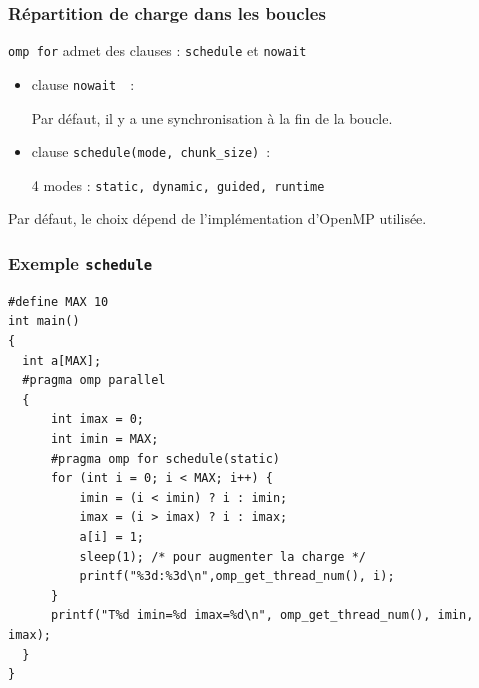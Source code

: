 \documentclass{beamer}
\begin{document}
\begin{frame}
  \frametitle{Répartition de charge dans les boucles}
  
  \texttt{omp for} admet des clauses : {\tt schedule} et {\tt  nowait}
  
\bigskip
\begin{itemize}
\item clause {\tt nowait }~:

  Par défaut, il y a une synchronisation à la fin de la boucle.
  
\bigskip
\item clause {\tt schedule(mode, chunk\_size)}~:
  
  4 modes : {\tt static, dynamic, guided, runtime}
\end{itemize}
\bigskip
  Par défaut, le choix dépend de l'implémentation d'OpenMP utilisée.
\end{frame}

\begin{frame}[fragile]
   \frametitle{Exemple {\tt schedule}}
   \small
  
\begin{verbatim}
#define MAX 10
int main()
{
  int a[MAX];
  #pragma omp parallel
  {
      int imax = 0;
      int imin = MAX;
      #pragma omp for schedule(static)
      for (int i = 0; i < MAX; i++) {
          imin = (i < imin) ? i : imin;
          imax = (i > imax) ? i : imax;
          a[i] = 1;
          sleep(1); /* pour augmenter la charge */
          printf("%3d:%3d\n",omp_get_thread_num(), i);
      }
      printf("T%d imin=%d imax=%d\n", omp_get_thread_num(), imin, imax);
  }
}
\end{verbatim}
\end{frame}
\end{document}
